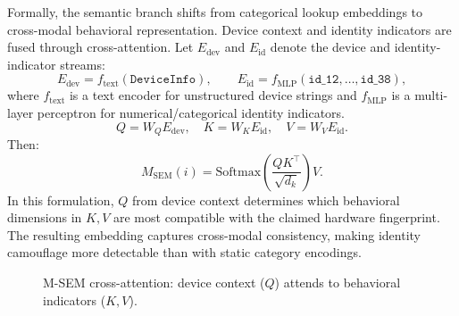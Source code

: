 \documentclass[12pt,a4paper]{report}
\begin{document}
Formally, the semantic branch shifts from categorical lookup embeddings to cross-modal behavioral representation. Device context and identity indicators are fused through cross-attention. Let $E_{\mathrm{dev}}$ and $E_{\mathrm{id}}$ denote the device and identity-indicator streams:
\begin{equation}
E_{\mathrm{dev}} = f_{\mathrm{text}}(\texttt{DeviceInfo}), \qquad
E_{\mathrm{id}} = f_{\mathrm{MLP}}(\texttt{id\_12},\ldots,\texttt{id\_38}),
\end{equation}
where $f_{\mathrm{text}}$ is a text encoder for unstructured device strings and $f_{\mathrm{MLP}}$ is a multi-layer perceptron for numerical/categorical identity indicators.
\begin{equation}
Q = W_Q E_{\mathrm{dev}}, \quad K = W_K E_{\mathrm{id}}, \quad V = W_V E_{\mathrm{id}}.
\end{equation}
Then:
\begin{equation}
M_{\mathrm{SEM}}(i)=\mathrm{Softmax}\left(\frac{QK^\top}{\sqrt{d_k}}\right)V.
\end{equation}
In this formulation, $Q$ from device context determines which behavioral dimensions in $K,V$ are most compatible with the claimed hardware fingerprint. The resulting embedding captures cross-modal consistency, making identity camouflage more detectable than with static category encodings.

\begin{figure}[htbp]
\centering
{}
\caption{M-SEM cross-attention: device context ($Q$) attends to behavioral indicators ($K,V$).}
\label{fig:msem-cross-attention}
\end{figure}
\end{document}
